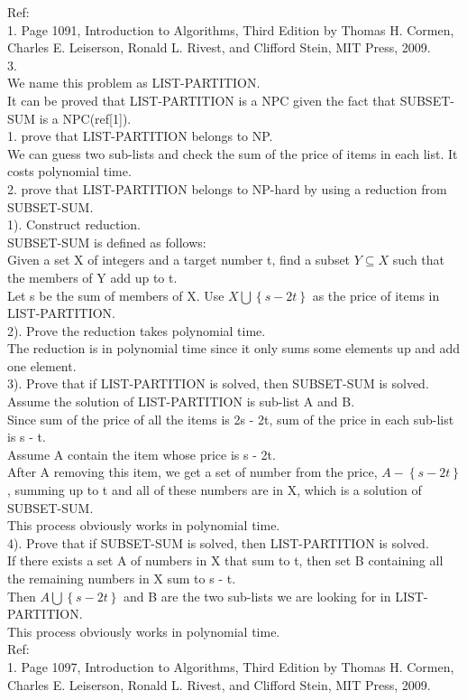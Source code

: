 \documentclass[a4paper]{article}
\begin{document}
Ref:\\
1. Page 1091, Introduction to Algorithms, Third Edition by Thomas H. Cormen, Charles E. Leiserson, Ronald L. Rivest, and Clifford Stein, MIT Press, 2009.\\

3.\\
We name this problem as LIST-PARTITION.\\
It can be proved that LIST-PARTITION is a NPC given the fact that SUBSET-SUM is a NPC(ref[1]).\\
1. prove that LIST-PARTITION belongs to NP.\\
We can guess two sub-lists and check the sum of the price of items in each list. It costs polynomial time.\\
2. prove that LIST-PARTITION belongs to NP-hard by using a reduction from SUBSET-SUM.\\
1). Construct reduction.\\
SUBSET-SUM is defined as follows:\\
Given a set X of integers and a target number t, find a subset $Y \subseteq X$ such that the members of Y add up to t.\\
Let s be the sum of members of X. Use $X \bigcup \left \{ s-2t \right \}$ as the price of items in LIST-PARTITION.\\
2). Prove the reduction takes polynomial time.\\
The reduction is in polynomial time since it only sums some elements up and add one element.\\
3). Prove that if LIST-PARTITION is solved, then SUBSET-SUM is solved.\\
Assume the solution of LIST-PARTITION is sub-list A and B.\\
Since sum of the price of all the items is 2s - 2t, sum of the price in each sub-list is s - t.\\
Assume A contain the item whose price is s - 2t.\\
After A removing this item, we get a set of number from the price, $A - \left \{ s-2t \right \}$, summing up to t and all of these numbers are in X, which is a solution of SUBSET-SUM.\\
This process obviously works in polynomial time.\\
4). Prove that if SUBSET-SUM is solved, then LIST-PARTITION is solved.\\
If there exists a set A of numbers in X that sum to t, then set B containing all the remaining numbers in X sum to s - t. \\
Then $A \bigcup \left \{ s-2t \right \}$ and B are the two sub-lists we are looking for in LIST-PARTITION.\\
This process obviously works in polynomial time.\\

Ref:\\
1. Page 1097, Introduction to Algorithms, Third Edition by Thomas H. Cormen, Charles E. Leiserson, Ronald L. Rivest, and Clifford Stein, MIT Press, 2009.\\
\end{document}
